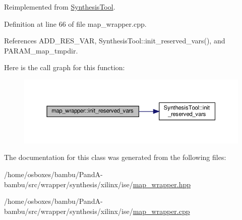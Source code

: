 Reimplemented from \hyperlink{classSynthesisTool_a85b4a4fa0cc60e5325a79d7479c505b7}{Synthesis\+Tool}.



Definition at line 66 of file map\+\_\+wrapper.\+cpp.



References A\+D\+D\+\_\+\+R\+E\+S\+\_\+\+V\+AR, Synthesis\+Tool\+::init\+\_\+reserved\+\_\+vars(), and P\+A\+R\+A\+M\+\_\+map\+\_\+tmpdir.

Here is the call graph for this function\+:
\nopagebreak
\begin{figure}[H]
\begin{center}
\leavevmode
\includegraphics[width=350pt]{d4/d76/classmap__wrapper_a206084d1b97e49db459560b12e6175df_cgraph}
\end{center}
\end{figure}


The documentation for this class was generated from the following files\+:\begin{DoxyCompactItemize}
\item 
/home/osboxes/bambu/\+Pand\+A-\/bambu/src/wrapper/synthesis/xilinx/ise/\hyperlink{map__wrapper_8hpp}{map\+\_\+wrapper.\+hpp}\item 
/home/osboxes/bambu/\+Pand\+A-\/bambu/src/wrapper/synthesis/xilinx/ise/\hyperlink{map__wrapper_8cpp}{map\+\_\+wrapper.\+cpp}\end{DoxyCompactItemize}
